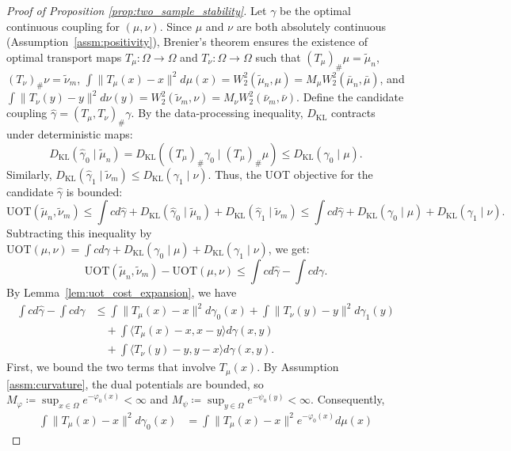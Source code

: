\documentclass[11pt,reqno]{amsart}
\theoremstyle{definition}
\newcommand{\KL}{\mathrm{KL}}
\renewcommand{\hat}{\widehat}
\renewcommand{\tilde}{\widetilde}
\begin{document}
\begin{proof}[Proof of Proposition \ref{prop:two_sample_stability}]
Let $\gamma$ be the optimal continuous coupling for $(\mu,\nu)$. Since $\mu$ and $\nu$ are both absolutely continuous (Assumption~\ref{assm:positivity}), Brenier's theorem ensures the existence of optimal transport maps $T_\mu: \Omega \to \Omega$ and $T_\nu: \Omega \to \Omega$ such that $(T_\mu)_\# \mu = \tilde\mu_n$, $(T_\nu)_\# \nu = \tilde\nu_m$, $\int \|T_\mu(x)-x\|^2 d\mu(x) = W_2^2(\tilde\mu_n, \mu)=M_\mu W_2^2(\bar\mu_n,\bar\mu)$, and $\int \|T_\nu(y)-y\|^2 d\nu(y) = W_2^2(\tilde\nu_m, \nu)=M_\nu W_2^2(\bar\nu_m,\bar\nu)$. Define the candidate coupling $\hat \gamma = (T_\mu, T_\nu)_\# \gamma$.
{By the data-processing inequality, $D_\KL$ contracts under deterministic maps:}
$$ {D_\KL}(\hat\gamma_0 \mid \tilde\mu_n) = {D_\KL}((T_\mu)_\# \gamma_0 \mid (T_\mu)_\# \mu) \leq {D_\KL}(\gamma_0 \mid \mu). $$
Similarly, ${D_\KL}(\hat\gamma_1 \mid \tilde\nu_m) \leq {D_\KL}(\gamma_1 \mid \nu)$. Thus, the UOT objective for the candidate $\hat \gamma$ is bounded:
$$ \mathrm{UOT}(\tilde\mu_n, \tilde\nu_m) \leq \int c d\hat\gamma + {D_\KL}(\hat\gamma_0 \mid \tilde\mu_n) + {D_\KL}(\hat\gamma_1 \mid \tilde\nu_m) \leq \int c d\hat\gamma + {D_\KL}(\gamma_0 \mid \mu) + {D_\KL}(\gamma_1 \mid \nu). $$
Subtracting this inequality by $\mathrm{UOT}(\mu,\nu) = \int c d\gamma + {D_\KL}(\gamma_0 \mid \mu) + {D_\KL}(\gamma_1 \mid \nu)$, we get:
$$ \mathrm{UOT}(\tilde\mu_n, \tilde\nu_m) - \mathrm{UOT}(\mu,\nu) \leq \int c d\hat\gamma - \int c d\gamma. $$
By Lemma~\ref{lem:uot_cost_expansion}, we have
\begin{equation}
\label{eq:cost_diff_exact_0}
\begin{aligned}
\int c d\hat\gamma - \int c d\gamma 
&\le \int \|T_\mu(x)-x\|^2 d\gamma_0(x) + \int \|T_\nu(y)-y\|^2 d\gamma_1(y) \\
&\quad + \int \langle T_\mu(x)-x, x-y \rangle d\gamma(x,y) \\
&\quad + \int \langle T_\nu(y)-y, y-x \rangle d\gamma(x,y).
\end{aligned}
\end{equation}
First, we bound the two terms that involve $T_\mu(x)$.
By Assumption \ref{assm:curvature}, the dual potentials are bounded, so $M_\varphi \coloneqq \sup_{x\in\Omega} e^{-\varphi_0(x)} < \infty$ and $M_\psi \coloneqq \sup_{y\in\Omega} e^{-\psi_0(y)} < \infty$. Consequently,
\begin{align}
    \int \|T_\mu(x)-x\|^2 d\gamma_0(x)
    &=
    \int \|T_\mu(x)-x\|^2 e^{-\varphi_0(x)} d\mu(x)

\end{align}
\end{proof}
\end{document}
